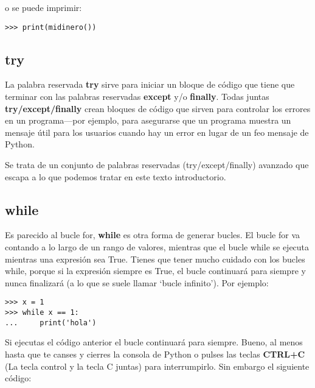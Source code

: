 \begin{listing}
\noindent
o se puede imprimir:

\begin{listingignore}
\begin{verbatim}
>>> print(midinero())
\end{verbatim}
\end{listingignore}

\subsection*{try}

La palabra reservada \textbf{try} sirve para iniciar un bloque de código que tiene que terminar con las palabras reservadas \textbf{except} y/o \textbf{finally}.  Todas juntas \textbf{try/except/finally} crean bloques de código que sirven para controlar los errores en un programa---por ejemplo, para asegurarse que un programa muestra un mensaje útil para los usuarios cuando hay un error  en lugar de un feo mensaje de Python.

Se trata de un conjunto de palabras reservadas (try/except/finally) avanzado que escapa a lo que podemos tratar en este texto introductorio.

\subsection*{while}

Es parecido al bucle for, \textbf{while} es otra forma de generar bucles.  El bucle for va contando a lo largo de un rango de valores, mientras que el bucle while se ejecuta mientras una expresión sea True.   Tienes que tener mucho cuidado con los bucles while, porque si la expresión siempre es True, el bucle continuará para siempre y nunca finalizará (a lo que se suele llamar `bucle infinito').   Por ejemplo:

\begin{listingignore}
\begin{verbatim}
>>> x = 1
>>> while x == 1:
...     print('hola')
\end{verbatim}
\end{listingignore}

Si ejecutas el código anterior el bucle continuará para siempre.   Bueno, al menos hasta que te canses y cierres la consola de Python o pulses las teclas \textbf{CTRL+C} (La tecla control y la tecla C juntas) para interrumpirlo.   Sin embargo el siguiente código:


\end{listing}
